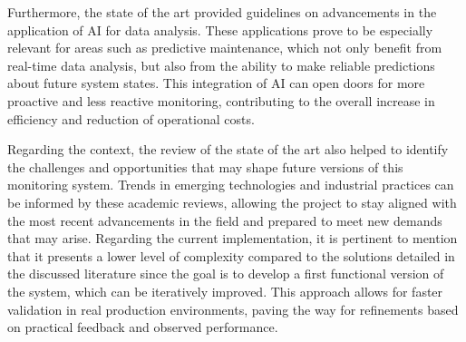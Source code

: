 Furthermore, the state of the art provided guidelines on advancements in the application of \gls{AI} for data analysis. These applications prove to be especially relevant for areas such as predictive maintenance, which not only benefit from real-time data analysis, but also from the ability to make reliable predictions about future system states. This integration of AI can open doors for more proactive and less reactive monitoring, contributing to the overall increase in efficiency and reduction of operational costs.

Regarding the context, the review of the state of the art also helped to identify the challenges and opportunities that may shape future versions of this monitoring system. Trends in emerging technologies and industrial practices can be informed by these academic reviews, allowing the project to stay aligned with the most recent advancements in the field and prepared to meet new demands that may arise.
Regarding the current implementation, it is pertinent to mention that it presents a lower level of complexity compared to the solutions detailed in the discussed literature since the goal is to develop a first functional version of the system, which can be iteratively improved. This approach allows for faster validation in real production environments, paving the way for refinements based on practical feedback and observed performance.